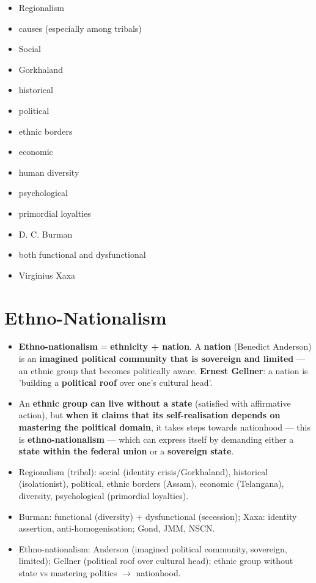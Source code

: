 \begin{QuickRevision}
\begin{itemize}
\item Regionalism
\item causes (especially among tribals)
\item Social
\item Gorkhaland
\item historical
\item political
\item ethnic borders
\item economic
\item human diversity
\item psychological
\item primordial loyalties
\item D. C. Burman
\item both functional and dysfunctional
\item Virginius Xaxa
\end{itemize}
\end{QuickRevision}

\section{Ethno-Nationalism}

\begin{KeyConcept}
\begin{itemize}
\item \textbf{Ethno-nationalism} = \textbf{ethnicity + nation}. A \textbf{nation} (Benedict Anderson) is an \textbf{imagined political community that is sovereign and limited} --- an ethnic group that becomes politically aware. \textbf{Ernest Gellner}: a nation is 'building a \textbf{political roof} over one's cultural head'.
\item An \textbf{ethnic group can live without a state} (satisfied with affirmative action), but \textbf{when it claims that its self-realisation depends on mastering the political domain}, it takes steps towards nationhood --- this is \textbf{ethno-nationalism} --- which can express itself by demanding either a \textbf{state within the federal union} or a \textbf{sovereign state}.
\end{itemize}
\end{KeyConcept}

\begin{QuickRevision}
\begin{itemize}
\item Regionalism (tribal): social (identity crisis/Gorkhaland), historical (isolationist), political, ethnic borders (Assam), economic (Telangana), diversity, psychological (primordial loyalties).
\item Burman: functional (diversity) + dysfunctional (secession); Xaxa: identity assertion, anti-homogenisation; Gond, JMM, NSCN.
\item Ethno-nationalism: Anderson (imagined political community, sovereign, limited); Gellner (political roof over cultural head); ethnic group without state vs mastering politics $\rightarrow$ nationhood.
\end{itemize}
\end{QuickRevision}

